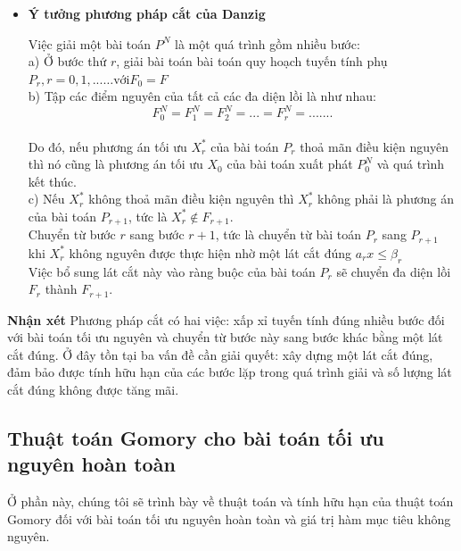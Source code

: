 \documentclass[12pt,a4paper]{report}
\begin{document}
\begin{itemize}
\begin{figure}[h]
    \end{figure}
    \newpage
\item \textbf{Ý tưởng phương pháp cắt của Danzig}
    
    Việc giải một bài toán $P^N$ là một quá trình gồm nhiều bước:\\
a) Ở bước thứ $r$,  giải bài toán bài toán quy hoạch tuyến tính phụ 
 $P_r, r = 0,1,... 
… \text{với}   F_0=F $\\
b) Tập các điểm  nguyên của tất cả các đa diện lồi là như nhau:
$$F_0^N=F_1^N=F_2^N=...=F_r^N=.......$$\\
Do đó, nếu phương án tối ưu $X^*_r$ của bài toán $P_r$ thoả mãn điều kiện nguyên thì nó cũng là phương án tối ưu $X_0$ của bài toán xuất phát $P^N_0$ và quá trình kết thúc.\\
c)  Nếu $X^*_r$ không thoả mãn điều kiện nguyên thì $X^*_r$ không phải là 
phương án của bài toán $P_{r+1}$, tức là $X_r^*\notin F_{r+1}$.\\Chuyển từ bước $r$ sang bước $r+1$, tức là chuyển từ bài toán $P_r$ sang 
 $P_{r+1}$ khi $X^*_r$ không nguyên được thực hiện nhờ một lát cắt đúng $a_rx \le \beta_r$\\
Việc bổ sung lát cắt này vào ràng buộc của bài toán $P_r$ sẽ chuyển đa diện lồi $F_r$ thành $F_{r+1}$.\\
    
\end{itemize}
\textbf{Nhận xét}
    Phương pháp cắt có hai việc: xấp xỉ tuyến tính đúng nhiều bước đối với bài toán tối ưu nguyên và chuyển từ bước này sang bước khác bằng một lát cắt đúng. Ở đây tồn tại ba vấn đề cần giải quyết: xây dựng một lát cắt đúng, đảm bảo được tính hữu hạn của các bước lặp trong quá trình giải và số lượng lát cắt đúng không được tăng mãi.
    
\subsection{ Thuật toán Gomory cho bài toán tối ưu nguyên hoàn toàn}
Ở phần này, chúng tôi sẽ trình bày về thuật toán và tính hữu hạn của thuật toán Gomory đối với bài toán tối ưu nguyên hoàn toàn và giá trị hàm mục tiêu không nguyên.
\end{document}
